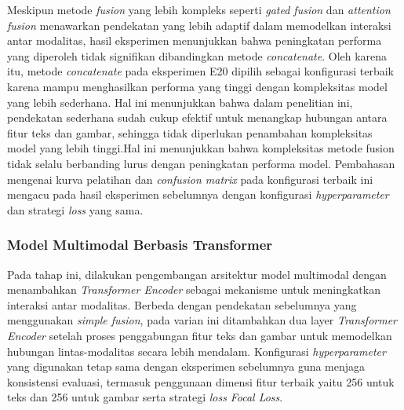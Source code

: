 Meskipun metode \textit{fusion} yang lebih kompleks seperti \textit{gated fusion} dan \textit{attention fusion} menawarkan pendekatan yang lebih adaptif dalam memodelkan interaksi antar modalitas, hasil eksperimen menunjukkan bahwa peningkatan performa yang diperoleh tidak signifikan dibandingkan metode \textit{concatenate}. Oleh karena itu, metode \textit{concatenate} pada eksperimen E20 dipilih sebagai konfigurasi terbaik karena mampu menghasilkan performa yang tinggi dengan kompleksitas model yang lebih sederhana. Hal ini menunjukkan bahwa dalam penelitian ini, pendekatan sederhana sudah cukup efektif untuk menangkap hubungan antara fitur teks dan gambar, sehingga tidak diperlukan penambahan kompleksitas model yang lebih tinggi.Hal ini menunjukkan bahwa kompleksitas metode fusion tidak selalu berbanding lurus dengan peningkatan performa model. Pembahasan mengenai kurva pelatihan dan \textit{confusion matrix} pada konfigurasi terbaik ini mengacu pada hasil eksperimen sebelumnya dengan konfigurasi \textit{hyperparameter} dan strategi \textit{loss} yang sama.

\subsubsection{Model Multimodal Berbasis Transformer} \label{IV.MultimodalTransformer}
Pada tahap ini, dilakukan pengembangan arsitektur model multimodal dengan menambahkan \textit{Transformer Encoder} sebagai mekanisme untuk meningkatkan interaksi antar modalitas. Berbeda dengan pendekatan sebelumnya yang menggunakan \textit{simple fusion}, pada varian ini ditambahkan dua layer \textit{Transformer Encoder} setelah proses penggabungan fitur teks dan gambar untuk memodelkan hubungan lintas-modalitas secara lebih mendalam. Konfigurasi \textit{hyperparameter} yang digunakan tetap sama dengan eksperimen sebelumnya guna menjaga konsistensi evaluasi, termasuk penggunaan dimensi fitur terbaik yaitu 256 untuk teks dan 256 untuk gambar serta strategi \textit{loss} \textit{Focal Loss}. 

